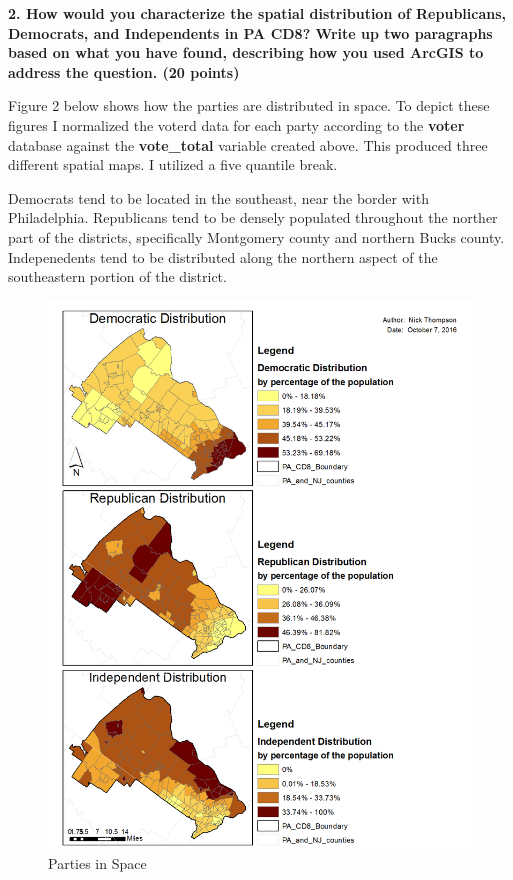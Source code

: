 \documentclass[12pt]{article}
\begin{document}
\clearpage


\noindent \textbf{2. How would you characterize the spatial distribution of Republicans, Democrats, and Independents in PA CD8?  Write up two paragraphs based on what you have found, describing how you used ArcGIS to address the question.  (20 points)}

Figure 2 below shows how the parties are distributed in space.  To depict these figures I normalized the voterd data for each party according to the \textbf{voter} database against the \textbf{vote\_total} variable created above.  This produced three different spatial maps.   I utilized a five quantile break.  

Democrats tend to be located in the southeast, near the border with Philadelphia.  Republicans tend to be densely populated throughout the norther part of the districts, specifically Montgomery county and northern Bucks county.  Indepenedents tend to be distributed along the northern aspect of the southeastern portion of the district.
 
\begin{figure}[H]
	\caption{Parties in Space}
	\centerline{\includegraphics[scale=.75]{question_2.png}} %
\end{figure}
\end{document}
